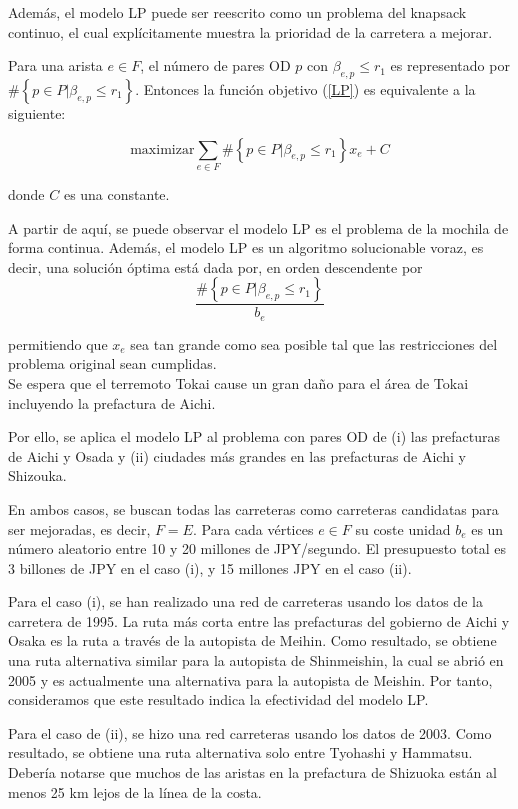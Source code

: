 \documentclass[10pt]{report}
\begin{document}
Además, el modelo LP puede ser reescrito como un problema del knapsack continuo, el cual explícitamente muestra la prioridad de la carretera a mejorar.

Para una arista $e \in F$, el número de pares OD $p$ con $\beta_{e,p} \leq r_{1}$ es representado por $\#\left\{ p \in P | \beta_{e,p} \leq r_{1} \right \}$. 
Entonces la función objetivo  (\ref{LP}) es equivalente a la siguiente:

$$
\text{maximizar} \sum_{e \in F} \#\left\{ p \in P | \beta_{e,p} \leq r_{1} \right\} x_{e} + C
$$

donde $C$ es una constante.

A partir de aquí, se puede observar el modelo LP es el problema de la mochila de forma continua. Además, el modelo LP es un algoritmo solucionable voraz, es decir, una solución óptima está dada por, en orden descendente  por
$$
\frac{\#\left\{ p \in P | \beta_{e,p} \leq r_{1} \right\}}{b_{e}}
$$

permitiendo que $x_{e}$ sea tan grande como sea posible tal que las restricciones del problema original sean cumplidas.\\

Se espera que el terremoto Tokai cause un gran daño para el área de Tokai incluyendo la prefactura de Aichi.

Por ello, se aplica el modelo LP al problema con pares OD de (i) las prefacturas de Aichi y Osada y (ii)  ciudades más grandes en las prefacturas de Aichi y Shizouka.

En ambos casos, se buscan todas las carreteras como carreteras candidatas para ser mejoradas, es decir, $F=E$.
Para cada vértices $e \in F$ su coste unidad $b_{e}$ es un número aleatorio entre 10 y 20 millones de JPY/segundo. El presupuesto total es 3 billones de JPY en el caso (i), y 15 millones  JPY en el caso (ii).

Para el caso (i), se han realizado una red de carreteras usando los datos de la carretera de 1995. La ruta más corta entre las prefacturas  del gobierno de Aichi y Osaka es la ruta a través de la autopista de Meihin. Como resultado, se obtiene una ruta alternativa similar para la autopista de Shinmeishin, la cual se abrió en 2005 y es actualmente una alternativa para la autopista de Meishin.
Por tanto, consideramos que este resultado indica la efectividad del modelo LP.

Para el caso de (ii), se hizo una red carreteras usando los datos de 2003.  Como resultado, se obtiene una ruta alternativa solo entre Tyohashi y Hammatsu.
Debería notarse que muchos de las aristas en la prefactura de Shizuoka están al menos 25 km lejos de la línea de la costa.
\end{document}
